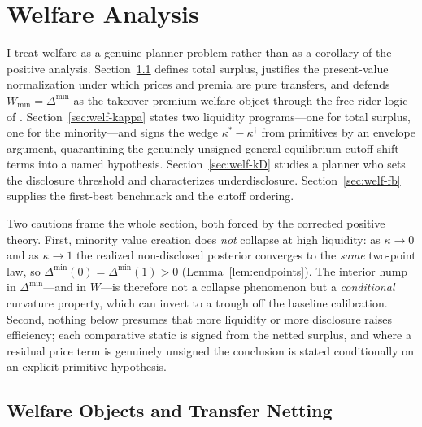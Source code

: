 
\section{Welfare Analysis}
\label{sec:welfare}

I treat welfare as a genuine planner problem rather than as a corollary of the
positive analysis. Section~\ref{sec:welf-objects} defines total surplus,
justifies the present-value normalization under which prices and premia are pure
transfers, and defends $W_{\min}=\Delta^{\min}$ as the takeover-premium welfare
object through the free-rider logic of \citet{GrossmanHart1980}.
Section~\ref{sec:welf-kappa} states two liquidity programs---one for total
surplus, one for the minority---and signs the wedge
$\kappa^{\ast}-\kappa^{\dagger}$ from primitives by an envelope argument,
quarantining the genuinely unsigned general-equilibrium cutoff-shift terms into a
named hypothesis. Section~\ref{sec:welf-kD} studies a planner who sets the
disclosure threshold and characterizes underdisclosure. Section~\ref{sec:welf-fb}
supplies the first-best benchmark and the cutoff ordering.

Two cautions frame the whole section, both forced by the corrected positive
theory. First, minority value creation does \emph{not} collapse at high
liquidity: as $\kappa\to0$ and as $\kappa\to1$ the realized non-disclosed
posterior converges to the \emph{same} two-point law, so
$\Delta^{\min}(0)=\Delta^{\min}(1)>0$ (Lemma~\ref{lem:endpoints}). The interior
hump in $\Delta^{\min}$---and in $W$---is therefore not a collapse phenomenon but
a \emph{conditional} curvature property, which can invert to a trough off the
baseline calibration. Second, nothing below presumes that more liquidity or more
disclosure raises efficiency; each comparative static is signed from the netted
surplus, and where a residual price term is genuinely unsigned the conclusion is
stated conditionally on an explicit primitive hypothesis.

%
\subsection{Welfare Objects and Transfer Netting}
\label{sec:welf-objects}
%

